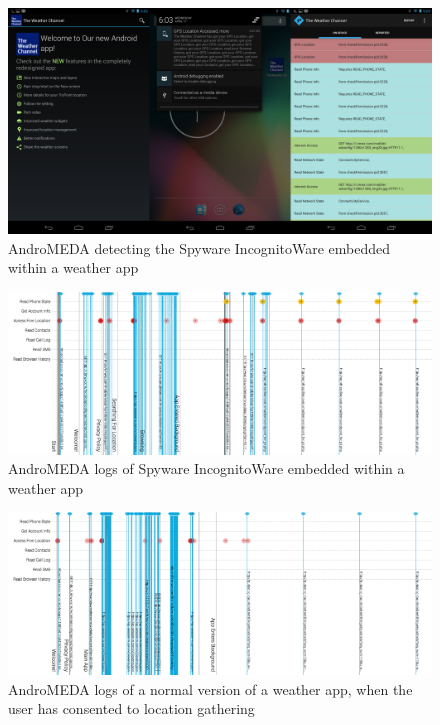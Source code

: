 \documentclass{acm_proc_article-sp}
\begin{document}
\begin{figure}[h]
\begin{center}
\includegraphics[width=1.0\columnwidth]{figs/weather_detection}
\caption{AndroMEDA detecting the Spyware IncognitoWare embedded within a weather app }
\label{fig:spyware_visual}
\end{center}
\end{figure}


\begin{figure}[h]
\begin{center}
\includegraphics[width=1.0\columnwidth]{figs/AndroMEDA_Weather_Malware}
\caption{AndroMEDA logs of Spyware IncognitoWare embedded within a weather app }
\label{fig:spyware_logs_malware}
\end{center}
\end{figure}

\begin{figure}[h]
\begin{center}
\includegraphics[width=1.0\columnwidth]{figs/AndroMEDA_Weather_Notmalware_Location}
\caption{AndroMEDA logs of a normal version of a weather app, when the user has consented to location gathering }
\label{fig:spyware_logs_nonmalware_location}
\end{center}
\end{figure}
\end{document}
